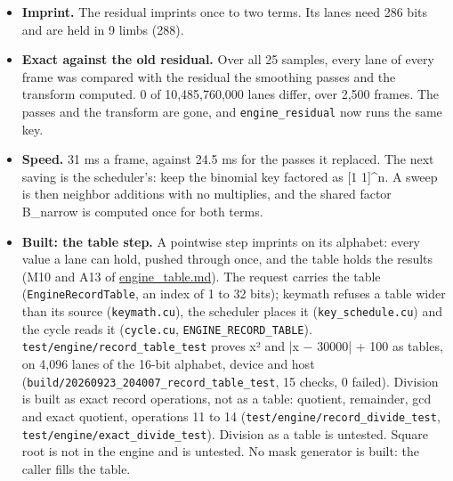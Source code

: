 \begin{itemize}
\item \textbf{Imprint.} The residual imprints once to two terms. Its lanes need 286 bits and are held in 9 limbs (288).
\item \textbf{Exact against the old residual.} Over all 25 samples, every lane of every frame was compared with the residual the smoothing passes and the transform computed. 0 of 10,485,760,000 lanes differ, over 2,500 frames. The passes and the transform are gone, and \texttt{engine\_\allowbreak{}residual} now runs the same key.
\item \textbf{Speed.} 31 ms a frame, against 24.5 ms for the passes it replaced. The next saving is the scheduler's: keep the binomial key factored as [1 1]\textasciicircum{}n. A sweep is then neighbor additions with no multiplies, and the shared factor B\_\allowbreak{}narrow is computed once for both terms.
\item \textbf{Built: the table step.} A pointwise step imprints on its alphabet: every value a lane can hold, pushed through once, and the table holds the results (M10 and A13 of \hyperref[chap:engine-table]{engine\_\allowbreak{}table.md}). The request carries the table (\texttt{Engine\allowbreak{}Record\allowbreak{}Table}, an index of 1 to 32 bits); keymath refuses a table wider than its source (\texttt{keymath.\allowbreak{}cu}), the scheduler places it (\texttt{key\_\allowbreak{}schedule.\allowbreak{}cu}) and the cycle reads it (\texttt{cycle.\allowbreak{}cu}, \texttt{ENGINE\_\allowbreak{}RECORD\_\allowbreak{}TABLE}). \texttt{test/\allowbreak{}engine/\allowbreak{}record\_\allowbreak{}table\_\allowbreak{}test} proves x² and |x − 30000| + 100 as tables, on 4,096 lanes of the 16-bit alphabet, device and host (\texttt{build/\allowbreak{}20260923\_\allowbreak{}204007\_\allowbreak{}record\_\allowbreak{}table\_\allowbreak{}test}, 15 checks, 0 failed). Division is built as exact record operations, not as a table: quotient, remainder, gcd and exact quotient, operations 11 to 14 (\texttt{test/\allowbreak{}engine/\allowbreak{}record\_\allowbreak{}divide\_\allowbreak{}test}, \texttt{test/\allowbreak{}engine/\allowbreak{}exact\_\allowbreak{}divide\_\allowbreak{}test}). Division as a table is untested. Square root is not in the engine and is untested. No mask generator is built: the caller fills the table.
\end{itemize}
